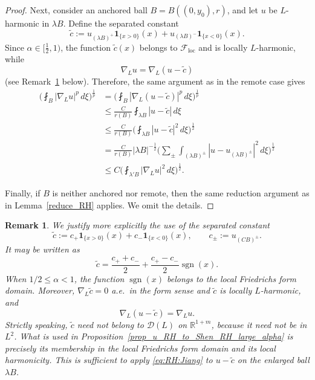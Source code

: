 \documentclass[12pt]{amsart}
\newtheorem{remark}[theorem]{Remark}
\begin{document}
\begin{proof}
Next, consider an anchored ball $B=B((0,y_0), r)$, and let $u$ be $L$-harmonic in $\lambda B$. Define the separated constant
\begin{equation*}
\widetilde{c} := u_{(\lambda B)^+}\mathbf 1_{\{x>0\}}(x) + u_{(\lambda B)^-} \mathbf 1_{\{x<0\}}(x).
\end{equation*}
Since $\alpha\in [\frac{1}{2},1)$, the function $\widetilde{c}(x)$ belongs to $\mathcal{F}_{\mathrm{loc}}$ and is locally $L$-harmonic, while
\begin{equation*}
    \nabla_L u=\nabla_L(u-\widetilde{c})
\end{equation*}
(see Remark~\ref{rem_separated_constant_Friedrichs} below). Therefore, the same argument as in the remote case gives
\begin{align*}
    \biggl( \fint_B |\nabla_L u|^p \, d\xi \biggr)^{\!\frac{1}{p}}
    &=\biggl( \fint_B |\nabla_L (u-\widetilde{c})|^p \, d\xi \biggr)^{\!\frac{1}{p}} \\
    &\le \frac{C}{r(B)}  \fint_{\lambda B} |u-\widetilde{c}| \, d\xi  \\
    &\le \frac{C}{r(B)} \biggl(\fint_{\lambda B} |u-\widetilde{c}|^2 \, d\xi \biggr)^{\!\frac{1}{2}}\\
    &= \frac{C}{r(B)} |\lambda B|^{-\frac{1}{2}} \biggl( \sum_{\pm} \int_{(\lambda B)^{\pm}} |u-u_{(\lambda B)^{\pm}}|^2 \, d\xi \biggr)^{\!\frac{1}{2}} \\
    &\le C \biggl(\fint_{\lambda' B} |\nabla_L u|^2 \, d\xi \biggr)^{\!\frac{1}{2}}.
\end{align*}

Finally, if $B$ is neither anchored nor remote, then the same reduction argument as in Lemma~\ref{reduce_RH} applies. We omit the details.
\end{proof}






\begin{remark}\label{rem_separated_constant_Friedrichs}
We justify more explicitly the use of the separated constant
\begin{equation*}
\widetilde c
:=
c_+\mathbf 1_{\{x>0\}}(x)
+
c_-\mathbf 1_{\{x<0\}}(x),
\qquad
c_\pm:=u_{(CB)^\pm}.
\end{equation*}
It may be written as
\begin{equation*}
\widetilde c
=
\frac{c_++c_-}{2}
+
\frac{c_+-c_-}{2}\operatorname{sgn}(x).
\end{equation*}
When $1/2\le \alpha<1$, the function $\operatorname{sgn}(x)$ belongs to the local
Friedrichs form domain. Moreover, $\nabla_L\widetilde c=0$ a.e.\ in the form sense and $\widetilde c$ is locally $L$-harmonic, and
\begin{equation*}
\nabla_L(u-\widetilde c)=\nabla_Lu.
\end{equation*}
Strictly speaking, $\widetilde c$ need not belong to $\mathcal D(L)$ on $\mathbb R^{1+m}$, because it need not be in $L^2$. What is used
in Proposition~\ref{prop_u_RH_to_Shen_RH_large_alpha} is precisely its membership in the local Friedrichs form domain and its local harmonicity. This is sufficient to apply \eqref{eq:RH:Jiang} to
$u-\widetilde c$ on the enlarged ball $\lambda B$.
\end{remark}
\end{document}
